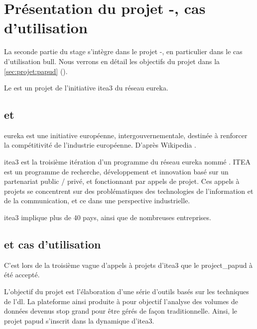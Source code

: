 %
%

\section{Présentation du projet -, cas d'utilisation }
La seconde partie du stage s'intègre dans le projet -, en particulier dans le cas d'utilisation \gls{bull}. Nous verrons en détail les objectifs du projet dans la \autoref{sec:projet:papud} ().

Le  est un projet de l'initiative \gls{itea3} du réseau \gls{eureka}.

\newpage
\subsection{ et }
\og\gls{eureka} est une initiative européenne, intergouvernementale, destinée à renforcer la compétitivité de l’industrie européenne.\fg{} D'après Wikipedia \autocite{wiki_eureka}.

\gls{itea3} est la troisième itération d'un programme du réseau \gls{eureka} nommé .
ITEA est un programme de recherche, développement et innovation basé sur un partenariat public / privé, et fonctionnant par appels de projet.
Ces appels à projets se concentrent sur des problématiques des technologies de l'information et de la communication, et ce dans une perspective industrielle.

\gls{itea3} implique plus de 40 pays, ainsi que de nombreuses entreprises.


\subsection{ et cas d'utilisation }
C'est lors de la troisième vague d'appels à projets d'\gls{itea3} que le  \gls{project_papud} à été accepté.

L'objectif du projet  est l'élaboration d'une série d'outils basés sur les techniques de l'\gls{dl}.
La plateforme ainsi produite à pour objectif l'analyse des volumes de données devenus stop grand pour être gérés de façon traditionnelle.
Ainsi, le projet \gls{papud} s'inscrit dans la dynamique d'\gls{itea3}.


